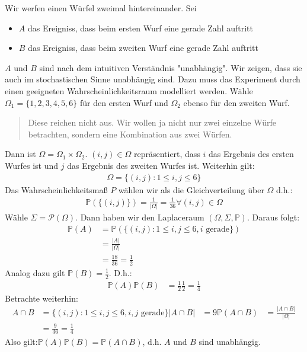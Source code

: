 \begin{example}
Wir werfen einen Würfel zweimal hintereinander. Sei
\begin{itemize}
\item $A$ das Ereigniss, dass beim ersten Wurf eine gerade Zahl auftritt
\item $B$ das Ereigniss, dass beim zweiten Wurf eine gerade Zahl auftritt
\end{itemize}
$A$ und $B$ sind nach dem intuitiven Verständnis "unabhängig". Wir zeigen, dass sie auch im stochastischen Sinne %
unabhängig sind. Dazu muss das Experiment durch einen geeigneten Wahrscheinlichkeitsraum modelliert werden. %
Wähle $\Omega_1=\{1,2,3,4,5,6\}$ für den ersten Wurf und $\Omega_2$ ebenso für den zweiten Wurf.
\begin{quote}
Diese reichen nicht aus. Wir wollen ja nicht nur zwei einzelne Würfe betrachten, sondern eine Kombination aus zwei %
Würfen.
\end{quote}
Dann ist $\Omega = \Omega_1 \times \Omega_2$. $(i,j) \in \Omega$ repräsentiert, dass $i$ das Ergebnis des ersten Wurfes %
ist und $j$ das Ergebnis des zweiten Wurfes ist. Weiterhin gilt:
\begin{align*}
\Omega = \{ (i,j) : 1 \leq i,j \leq 6 \}
\end{align*}
Das Wahrscheinlichkeitsmaß $P$ wählen wir als die Gleichverteilung über $\Omega$ d.h.:
\begin{align*}
\mathbb P(\{(i,j)\}) = \frac{1}{\lvert \Omega \rvert} = \frac{1}{36} \forall (i,j) \in \Omega
\end{align*}
Wähle $\Sigma = \mathcal P(\Omega)$. Dann haben wir den Laplaceraum $(\Omega,\Sigma,\mathbb P)$. Daraus folgt: 
\begin{align*}
\mathbb P(A) &= \mathbb P ( \{(i,j) : 1\leq i,j \leq 6, i \text{ gerade} \}) \\
	&=\frac{\lvert A \rvert}{\lvert \Omega \rvert} \\
	&=\frac{18}{36} = \frac{1}{2}
\end{align*}
Analog dazu gilt $\mathbb P(B)= \frac{1}{2}$. D.h.:
\begin{align*}
\mathbb P(A)\mathbb P(B) &= \frac{1}{2} \frac{1}{2} = \frac{1}{4}
\end{align*}
Betrachte weiterhin:
\begin{align*}
A \cap B &= \{(i,j) : 1\leq i,j \leq 6, i,j \text{ gerade} \}
\lvert A \cap B \rvert &= 9
\mathbb P(A \cap B) &= \frac{\lvert A \cap B \rvert}{\lvert \Omega \rvert} \\
	&= \frac{9}{36} = \frac{1}{4}
\end{align*}
Also gilt:$\mathbb P(A)\mathbb P(B) = \mathbb P(A \cap B)$, d.h. $A$ und $B$ sind unabhängig.
\end{example}

